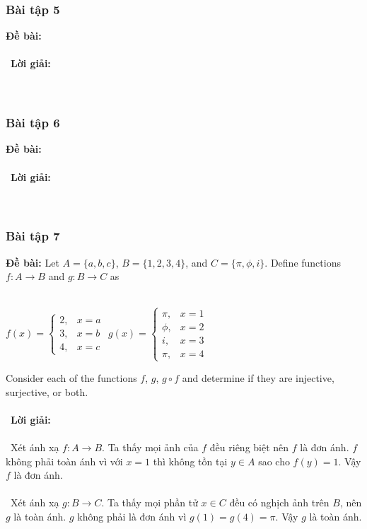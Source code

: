 \documentclass[a4paper]{article}
\begin{document}
\subsubsection{Bài tập 5}
\textbf{Đề bài:} 
\\\ \\\
\textbf{Lời giải:} \\\ \\\
\clearpage
\subsubsection{Bài tập 6}
\textbf{Đề bài:} 
\\\ \\\
\textbf{Lời giải:} \\\ \\\
\clearpage
\subsubsection{Bài tập 7}
\textbf{Đề bài:} Let $A = \{a, b, c\}$, $B = \{1, 2, 3, 4\}$, and $C = \{\pi, \phi, i\}$. Define functions $f : A \rightarrow B$ and $g : B \rightarrow C$ as \\\
\begin{center}
$f(x) = \begin{cases} 2, & x=a \\ 3, & x = b \\ 4, & x=c \end{cases}$ \hspace{0.5cm}
$g(x) = \begin{cases} \pi, & x=1 \\ \phi, & x = 2 \\ i, & x=3 \\ \pi, & x=4 \end{cases}$
\end{center}
Consider each of the functions $f$, $g$, $g\circ f$ and determine if they are injective, surjective, or both. \\\ \\\
\textbf{Lời giải:} \\\ \\\
Xét ánh xạ $f : A \rightarrow B$. Ta thấy mọi ảnh của $f$ đều riêng biệt nên $f$ là đơn ánh. $f$ không phải toàn ánh vì với $x = 1$ thì không tồn tại $y \in A$ sao cho $f(y) = 1$. Vậy $f$ là đơn ánh. \\\ \\\
Xét ánh xạ $g : B \rightarrow C$. Ta thấy mọi phần tử $x \in C$ đều có nghịch ảnh trên $B$, nên $g$ là toàn ánh. $g$ không phải là đơn ánh vì $g(1) = g(4) = \pi$. Vậy $g$ là toàn ánh. \\\ \\\
\end{document}
